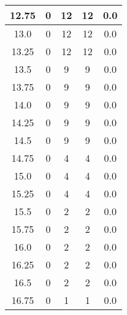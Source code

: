 \documentclass[letterpaper, 12pt]{article}
\begin{document}
\begin{longtable}{|c|c|c|c|c|}
\hline
12.75 & 0 & 12 & 12 & 0.0 \\
\hline
13.0 & 0 & 12 & 12 & 0.0 \\
\hline
13.25 & 0 & 12 & 12 & 0.0 \\
\hline
13.5 & 0 & 9 & 9 & 0.0 \\
\hline
13.75 & 0 & 9 & 9 & 0.0 \\
\hline
14.0 & 0 & 9 & 9 & 0.0 \\
\hline
14.25 & 0 & 9 & 9 & 0.0 \\
\hline
14.5 & 0 & 9 & 9 & 0.0 \\
\hline
14.75 & 0 & 4 & 4 & 0.0 \\
\hline
15.0 & 0 & 4 & 4 & 0.0 \\
\hline
15.25 & 0 & 4 & 4 & 0.0 \\
\hline
15.5 & 0 & 2 & 2 & 0.0 \\
\hline
15.75 & 0 & 2 & 2 & 0.0 \\
\hline
16.0 & 0 & 2 & 2 & 0.0 \\
\hline
16.25 & 0 & 2 & 2 & 0.0 \\
\hline
16.5 & 0 & 2 & 2 & 0.0 \\
\hline
16.75 & 0 & 1 & 1 & 0.0 \\
\hline
\end{longtable}
\end{document}
